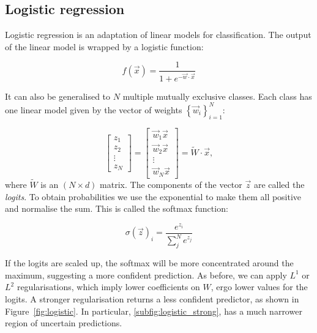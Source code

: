 \subsection{Logistic regression}\label{sec:logistic_regression}
Logistic regression  is an adaptation of linear models for classification.
The output of the linear model is wrapped by a logistic function:

\begin{equation*}
f(\vec x) = \frac{1}{1 + e^{- \vec{w} \cdot \vec x}}
\end{equation*}

It can also be generalised to $N$ multiple mutually exclusive classes.
Each class has one linear model given by the vector of weights $\left\{\vec w_i \right\}_{i=1} ^N$:

\begin{equation*}
\begin{bmatrix}z_1 \\ z_2 \\ \vdots \\ z_N\end{bmatrix} = 
\begin{bmatrix}
\vec w_1 \vec{x} \\ \vec w_2 \vec{x} \\ \vdots \\ \vec w_N \vec{x}
\end{bmatrix} = 
\widetilde W \cdot \vec{x},
\end{equation*}
where $\widetilde W$ is an $(N \times d)$ matrix.
The components of the vector $\vec{z}$ are called the \emph{logits}. 
To obtain probabilities we use the exponential to make them all positive and normalise the sum.
This is called the softmax function:

\begin{equation*}
\sigma(\vec{z})_i = \frac{e^{z_i}}{\sum_j^N e^{z_j}}
\end{equation*}

If the logits are scaled up, the softmax will be more concentrated around the maximum, suggesting a more confident prediction.
As before, we can apply $L^1$ or $L^2$ regularisations, which imply lower coefficients on $W$, ergo lower values for the logits.
A stronger regularisation returns a less confident predictor, as shown in Figure~\ref{fig:logistic}.
In particular, \ref{subfig:logistic_strong}, has a much narrower region of uncertain predictions. 

